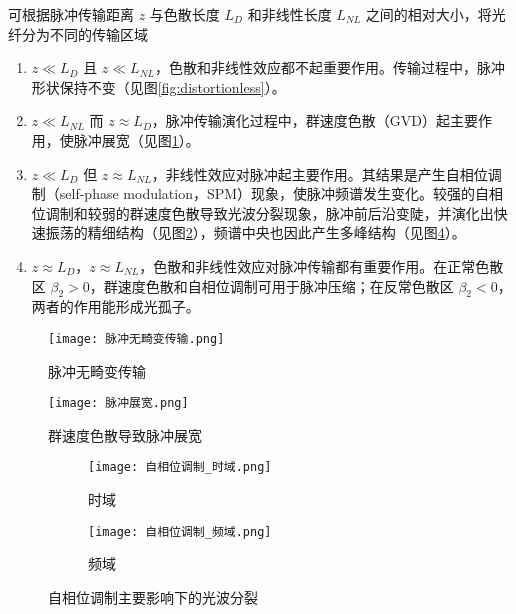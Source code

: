 可根据脉冲传输距离 $z$ 与色散长度 $L_D$ 和非线性长度 $L_{NL}$ 之间的相对大小，将光纤分为不同的传输区域\cite{Agrawal}
\begin{enumerate}[label=(\arabic*)]
    \item $z\ll L_{D}$ 且 $z\ll L_{NL}$，色散和非线性效应都不起重要作用。传输过程中，脉冲形状保持不变（见图\ref{fig:distortionless}）。
    \item $z\ll L_{NL}$ 而 $z\approx L_{D}$，脉冲传输演化过程中，群速度色散（GVD）起主要作用，使脉冲展宽（见图\ref{fig:GVD}）。
    \item $z\ll L_{D}$ 但 $z\approx L_{NL}$，非线性效应对脉冲起主要作用。其结果是产生自相位调制（self-phase modulation，SPM）现象，使脉冲频谱发生变化。较强的自相位调制和较弱的群速度色散导致光波分裂现象，脉冲前后沿变陡，并演化出快速振荡的精细结构（见图\ref{fig:SPM_time}），频谱中央也因此产生多峰结构\cite{Agrawal}（见图\ref{fig:SPM_frequent}）。
    \item $z\approx L_{D}$，$z\approx L_{NL}$，色散和非线性效应对脉冲传输都有重要作用。在正常色散区 $\beta_2>0$，群速度色散和自相位调制可用于脉冲压缩；在反常色散区 $\beta_2<0$，两者的作用能形成光孤子\cite{Agrawal}。
\end{enumerate}
\begin{figure}[tbp]
    \centering
    \begin{minipage}[t]{0.45\linewidth}
        \centering
        \texttt{[image: 脉冲无畸变传输.png]}
        \caption{脉冲无畸变传输}
        \label{fig:distortionless}
    \end{minipage}       
    \begin{minipage}[t]{0.45\linewidth}
        \centering
        \texttt{[image: 脉冲展宽.png]}
        \caption{群速度色散导致脉冲展宽}
        \label{fig:GVD}    
    \end{minipage}
\end{figure}
\begin{figure}[tbp]
    \centering
    \begin{subfigure}[t]{0.45\linewidth}
        \begin{minipage}[b]{1\linewidth}
        \texttt{[image: 自相位调制\_时域.png]}
        \caption{时域}
        \label{fig:SPM_time}
        \end{minipage}
    \end{subfigure}
    \begin{subfigure}[t]{0.45\linewidth}
        \begin{minipage}[b]{1\linewidth}
        \texttt{[image: 自相位调制\_频域.png]}
        \caption{频域}
        \label{fig:SPM_frequent}
        \end{minipage}
    \end{subfigure}
    \caption{自相位调制主要影响下的光波分裂}
\end{figure}

